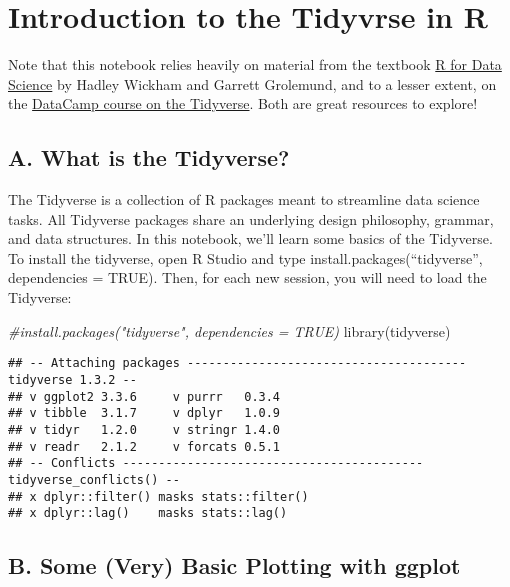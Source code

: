 \documentclass[
]{article}
\author{}
\date{\vspace{-2.5em}}
\newenvironment{Shaded}{\begin{snugshade}}{\end{snugshade}}
\newcommand{\CommentTok}[1]{\textcolor[rgb]{0.56,0.35,0.01}{\textit{#1}}}
\newcommand{\FunctionTok}[1]{\textcolor[rgb]{0.00,0.00,0.00}{#1}}
\newcommand{\NormalTok}[1]{#1}
\begin{document}
\hypertarget{introduction-to-the-tidyvrse-in-r}{%
\section{Introduction to the Tidyvrse in
R}\label{introduction-to-the-tidyvrse-in-r}}

Note that this notebook relies heavily on material from the textbook
\href{https://r4ds.had.co.nz/index.html}{R for Data Science} by Hadley
Wickham and Garrett Grolemund, and to a lesser extent, on the
\href{https://www.datacamp.com/courses/introduction-to-the-tidyverse}{DataCamp
course on the Tidyverse}. Both are great resources to explore!

\hypertarget{a.-what-is-the-tidyverse}{%
\subsection{A. What is the Tidyverse?}\label{a.-what-is-the-tidyverse}}

The Tidyverse is a collection of R packages meant to streamline data
science tasks. All Tidyverse packages share an underlying design
philosophy, grammar, and data structures. In this notebook, we'll learn
some basics of the Tidyverse. To install the tidyverse, open R Studio
and type install.packages(``tidyverse'', dependencies = TRUE). Then, for
each new session, you will need to load the Tidyverse:

\begin{Shaded}
\begin{Highlighting}[]
\CommentTok{\#install.packages("tidyverse", dependencies = TRUE)}
\FunctionTok{library}\NormalTok{(tidyverse)}
\end{Highlighting}
\end{Shaded}

\begin{verbatim}
## -- Attaching packages --------------------------------------- tidyverse 1.3.2 --
## v ggplot2 3.3.6     v purrr   0.3.4
## v tibble  3.1.7     v dplyr   1.0.9
## v tidyr   1.2.0     v stringr 1.4.0
## v readr   2.1.2     v forcats 0.5.1
## -- Conflicts ------------------------------------------ tidyverse_conflicts() --
## x dplyr::filter() masks stats::filter()
## x dplyr::lag()    masks stats::lag()
\end{verbatim}

\hypertarget{b.-some-very-basic-plotting-with-ggplot}{%
\subsection{B. Some (Very) Basic Plotting with
ggplot}\label{b.-some-very-basic-plotting-with-ggplot}}
\end{document}
